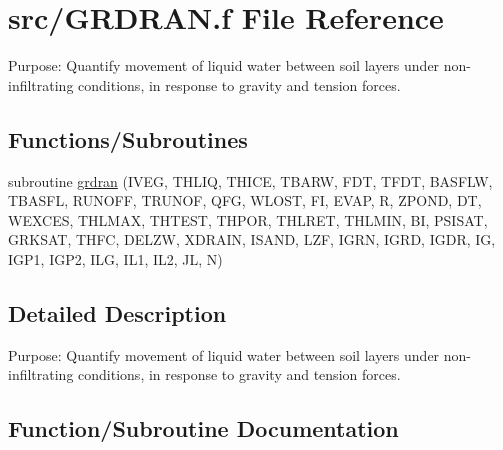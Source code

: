 \hypertarget{GRDRAN_8f}{}\section{src/\+G\+R\+D\+R\+A\+N.f File Reference}
\label{GRDRAN_8f}


Purpose\+: Quantify movement of liquid water between soil layers under non-\/infiltrating conditions, in response to gravity and tension forces.  


\subsection*{Functions/\+Subroutines}
\begin{DoxyCompactItemize}
\item 
subroutine \hyperlink{GRDRAN_8f_a9d02aa9115635af052981eec146b1042}{grdran} (I\+V\+E\+G, T\+H\+L\+I\+Q, T\+H\+I\+C\+E, T\+B\+A\+R\+W, F\+D\+T, T\+F\+D\+T, B\+A\+S\+F\+L\+W, T\+B\+A\+S\+F\+L, R\+U\+N\+O\+F\+F, T\+R\+U\+N\+O\+F, Q\+F\+G, W\+L\+O\+S\+T, F\+I, E\+V\+A\+P, R, Z\+P\+O\+N\+D, D\+T, W\+E\+X\+C\+E\+S, T\+H\+L\+M\+A\+X, T\+H\+T\+E\+S\+T, T\+H\+P\+O\+R, T\+H\+L\+R\+E\+T, T\+H\+L\+M\+I\+N, B\+I, P\+S\+I\+S\+A\+T, G\+R\+K\+S\+A\+T, T\+H\+F\+C, D\+E\+L\+Z\+W, X\+D\+R\+A\+I\+N, I\+S\+A\+N\+D, L\+Z\+F, I\+G\+R\+N, I\+G\+R\+D, I\+G\+D\+R, I\+G, I\+G\+P1, I\+G\+P2, I\+L\+G, I\+L1, I\+L2, J\+L, N)
\end{DoxyCompactItemize}


\subsection{Detailed Description}
Purpose\+: Quantify movement of liquid water between soil layers under non-\/infiltrating conditions, in response to gravity and tension forces. 



\subsection{Function/\+Subroutine Documentation}
\hypertarget{GRDRAN_8f_a9d02aa9115635af052981eec146b1042}{}
